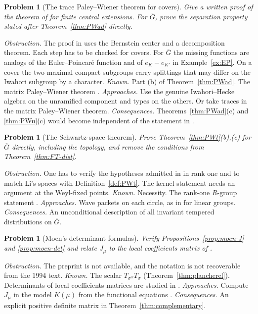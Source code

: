 \documentclass[12pt,letterpaper]{article}
\numberwithin{equation}{section}
\newtheorem{problem}[theorem]{Problem}
\theoremstyle{definition}
\newcommand{\bG}{\overline{G}}
\begin{document}
\begin{problem}[The trace Paley--Wiener theorem for covers]\label{prob:BDK}
Give a written proof of the theorem of \cite{BDK86} for finite central extensions.  For
$\bG$, prove the separation property stated after Theorem~\ref{thm:PWad} directly.
\end{problem}
\emph{Obstruction.}  The proof in \cite{BDK86} uses the Bernstein center and a
decomposition theorem.  Each step has to be checked for covers.  For $\bG$ the missing
functions are analogs of the Euler--Poincar\'e function and of $e_K-e_{K'}$ in
Example~\ref{ex:EP}.  On a cover the two maximal compact subgroups carry splittings that
may differ on the Iwahori subgroup by a character.  \emph{Known.}  Part (b) of
Theorem~\ref{thm:PWad}.  The matrix Paley--Wiener theorem \cite[Appendix~A]{He25}.
\emph{Approaches.}  Use the genuine Iwahori--Hecke algebra \cite{GGK24} on the unramified
component and types on the others.  Or take traces in the matrix Paley--Wiener theorem.
\emph{Consequences.}  Theorems~\ref{thm:PWad}(c) and \ref{thm:PWu}(c) would become
independent of the statement in \cite{Li14}.

\begin{problem}[The Schwartz-space theorem]\label{prob:schwartz}
Prove Theorem~\ref{thm:PWt}(b),(c) for $\bG$ directly, including the topology, and remove
the conditions from Theorem~\ref{thm:FT-dist}.
\end{problem}
\emph{Obstruction.}  One has to verify the hypotheses admitted in \cite{Li12} in rank one
and to match Li's spaces with Definition~\ref{def:PWt}.  The kernel statement needs an
argument at the Weyl-fixed points.  \emph{Known.}  Necessity.  The rank-one $R$-group
statement \cite{He25,Lu20}.  \emph{Approaches.}  Wave packets on each circle, as in
\cite{Ar94} for linear groups.  \emph{Consequences.}  An unconditional description of all
invariant tempered distributions on $\bG$.

\begin{problem}[Moen's determinant formulas]\label{prob:moen}
Verify Propositions~\ref{prop:moen-J} and \ref{prop:moen-det} and relate $J_\mu$ to the
local coefficients matrix of \cite{Sz19,GSS23}.
\end{problem}
\emph{Obstruction.}  The preprint \cite{MoND} is not available, and the notation is not
recoverable from the 1994 text.  \emph{Known.}  The scalar $T_{\sigma^w}T_\sigma$
(Theorem~\ref{thm:plancherel}).  Determinants of local coefficients matrices are studied
in \cite{GSS23}.  \emph{Approaches.}  Compute $J_\mu$ in the model $K(\mu)$ from the
functional equations \cite[Theorems~2.1, 2.2]{GS16}.  \emph{Consequences.}  An explicit
positive definite matrix in Theorem~\ref{thm:complementary}.
\end{document}
